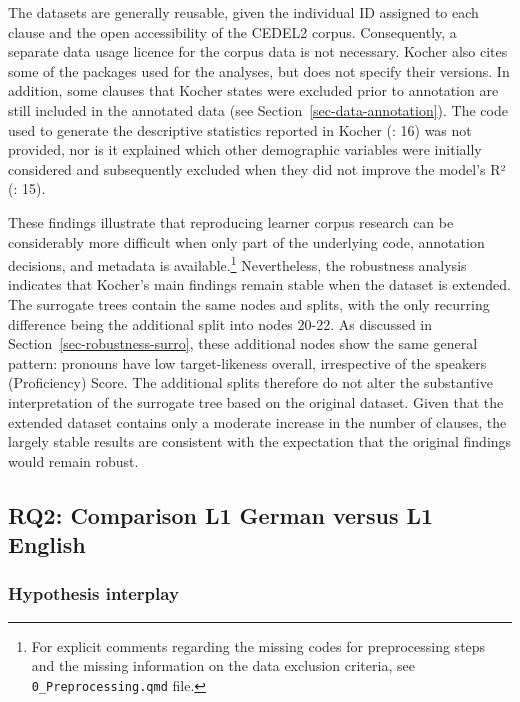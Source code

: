 \documentclass[
  letterpaper,
  DIV=11,
  numbers=noendperiod]{scrartcl}
\begin{document}
The datasets are generally reusable, given the individual ID assigned to
each clause and the open accessibility of the CEDEL2 corpus.
Consequently, a separate data usage licence for the corpus data is not
necessary. Kocher also cites some of the packages used for the analyses,
but does not specify their versions. In addition, some clauses that
Kocher states were excluded prior to annotation are still included in
the annotated data (see Section~\ref{sec-data-annotation}). The code
used to generate the descriptive statistics reported in Kocher
(: 16) was not provided, nor is
it explained which other demographic variables were initially considered
and subsequently excluded when they did not improve the model's R²
(: 15).

These findings illustrate that reproducing learner corpus research can
be considerably more difficult when only part of the underlying code,
annotation decisions, and metadata is available.\footnote{For explicit
  comments regarding the missing codes for preprocessing steps and the
  missing information on the data exclusion criteria, see
  \texttt{0\_Preprocessing.qmd} file.} Nevertheless, the robustness
analysis indicates that Kocher's main findings remain stable when the
dataset is extended. The surrogate trees contain the same nodes and
splits, with the only recurring difference being the additional split
into nodes 20-22. As discussed in Section~\ref{sec-robustness-surro},
these additional nodes show the same general pattern: pronouns have low
target-likeness overall, irrespective of the speakers (Proficiency)
Score. The additional splits therefore do not alter the substantive
interpretation of the surrogate tree based on the original dataset.
Given that the extended dataset contains only a moderate increase in the
number of clauses, the largely stable results are consistent with the
expectation that the original findings would remain robust.

\subsection{RQ2: Comparison L1 German versus L1
English}\label{rq2-comparison-l1-german-versus-l1-english}

\subsubsection{Hypothesis interplay}\label{hypothesis-interplay}
\end{document}
